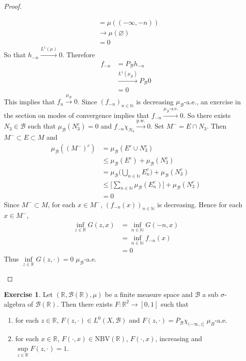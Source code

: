 \documentclass[12pt]{amsart}
\theoremstyle{definition}
\newtheorem{ex}[definition]{Exercise}
\newcommand{\sig}{\sigma}
\newcommand{\N}{\mathbb{N}}
\newcommand{\R}{\mathbb{R}}
\newcommand{\MB}{\mathcal{B}}
\newcommand{\convt}[1]{\xrightarrow{\text{#1}}}
\newcommand{\conv}[1]{\xrightarrow{#1}}
\newcommand{\NBV}{\text{NBV}}
\begin{document}
\begin{proof}
\begin{enumerate}
\begin{align*}
			& = \mu((-\infty, -n)) \\
			& \rightarrow \mu(\varnothing) \\
			& = 0 
		\end{align*}
		So that $h_{-n} \conv{L^1(\mu)} 0$. Therefore  
		\begin{align*}
			f_{-n}
			& = P_{\MB} h_{-n} \\
			& \conv{L^1(\mu_{\MB})} P_{\MB} 0 \\
			& = 0
		\end{align*}
		This implies that $f_n \conv{\mu_{\MB}} 0$. Since $(f_{-n})_{n \in \N}$ is decreasing $\mu_{\MB}$-a.e., an exercise in the section on modes of convergence implies that $f_{-n} \convt{$\mu_{\MB}$-a.e.} 0$. So there exists $N_3 \in \MB$ such that $\mu_{\MB}(N_3^c) = 0$ and $f_{-n} \chi_{N_3} \convt{p.w.} 0$. Set $M^- = E \cap N_3$. Then $M^- \subset E \subset M$ and
		\begin{align*}
			\mu_{\MB}((M^-)^c)
			& = \mu_{\MB}(E^c \cup N_3^c) \\ 
			& \leq \mu_{\MB}(E^c) + \mu_{\MB}(N_3^c) \\
			& = \mu_{\MB} \bigg( \bigcup_{n \in \N} E_n^c \bigg) + \mu_{\MB}(N_3^c) \\
			& \leq \bigg[\sum_{n \in \N} \mu_{\MB}(E_n^c) \bigg] + \mu_{\MB}(N_3^c) \\
			& = 0
		\end{align*}
		Since $M^- \subset M$, for each $x \in M^-$, $(f_{-n}(x))_{n \in \N}$ is decreasing. Hence for each $x \in M^-$,
		\begin{align*}
			\inf\limits_{z \in \R} G(z, x) 
			& = \inf\limits_{n \in \N} G(-n, x) \\
			& = \inf\limits_{n \in \N} f_{-n}(x) \\
			& = 0
		\end{align*}
		Thus $\inf\limits_{z \in \R} G(z, \cdot) = 0$ $\mu_{\MB}$-a.e.
		\end{enumerate}
	\end{proof}

	\begin{ex}
		Let $(\R, \MB(\R), \mu)$ be a finite measure space and $\MB$ a sub $\sig$-algebra of $\MB(\R)$. Then there exists $F: \R^2 \rightarrow [0,1]$ such that
		\begin{enumerate}
			\item for each $z \in \R$, $F(z, \cdot) \in L^0(X, \MB)$ and $F(z, \cdot) = P_{\MB}\chi_{(-\infty, z]}$ $\mu_B$-a.e.
			\item for each $x \in \R$, $F(\cdot, x) \in \NBV(\R)$, $F(\cdot, x)$, increasing and $\sup\limits_{z \in \R} F(z, \cdot) = 1$.
		\end{enumerate}
	\end{ex}
\end{document}
